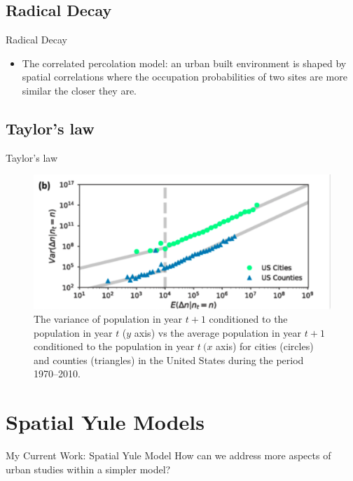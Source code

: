 \documentclass{beamer}
\begin{document}
\subsection{Radical Decay}
\begin{frame}{Radical Decay}
  \begin{itemize}
    \item The correlated percolation model: an urban built environment is shaped by spatial correlations where the occupation probabilities of two sites are more similar the closer they are.
  \end{itemize}
\end{frame}

\subsection{Taylor's law}

  \begin{frame}{Taylor's law}
    \begin{figure}
      \centering
      \includegraphics[width = 0.5\linewidth]{pics/taylor's.png}
      \caption{The variance of population in year $t+1$ conditioned to the population in year $t$ ($y$ axis) vs the average population in year $t+1$ conditioned to the population in year $t\ (x$
       axis) for cities (circles) and counties (triangles) in the United States during the period 1970–2010.}
    \end{figure}
  \end{frame}


\section{Spatial Yule Models}

\begin{frame}{My Current Work: Spatial Yule Model}
  How can we address more aspects of urban studies within a simpler model?
\end{frame}
\end{document}
